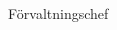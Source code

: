 \documentclass[../_main/handlingar.tex]{subfiles}
\begin{document}


\begin{signatures}{1}
    \mvh
    \signature{\fvc}{Förvaltningschef}
\end{signatures}
\end{document}
